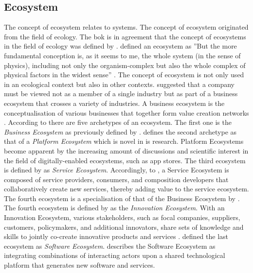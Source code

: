 \subsection{Ecosystem}
\label{sub:tbecosystem}
The concept of ecosystem relates to systems. The concept of ecosystem originated from the field of ecology. The \acrfull{bok} is in agreement that the concept of ecosystems in the field of ecology was defined by \textcite{Tansley1935}. \textcite[p.~299]{Tansley1935} defined an ecosystem as ''But the more fundamental conception is, as it seems to me, the whole system (in the sense of physics), including not only the organism-complex but also the whole complex of physical factors in the widest sense'' \parencites[p.~3]{Guggenberger2020}[p.~20]{Nurmi2021}. The concept of ecosystem is not only used in an ecological context but also in other contexts. \textcite[p.~76]{Moore1999} suggested that a company must be viewed not as a member of a single industry but as part of a business ecosystem that crosses a variety of industries. A business ecosystem is the conceptualisation of various businesses that together form value creation networks \parencite[p.~3]{Guggenberger2020}. According to \textcite[]{Guggenberger2020} there are five archetypes of an ecosystem. The first one is the \textit{Business Ecosystem} as previously defined by \textcite[p.~76]{Moore1999}. \textcite[p.~5]{Guggenberger2020} defines the second archetype as that of a \textit{Platform Ecosystem} which is novel in \acrfull{is} research. Platform Ecosystems become apparent by the increasing amount of discussions and scientific interest in the field of digitally-enabled ecosystems, such as app stores. The third ecosystem is defined by \textcite[p.~5]{Guggenberger2020} as \textit{Service Ecosystem}. Accordingly, to \textcites{Barros2006}{Papazoglou2006}{Huang2014}, a Service Ecosystem is composed of service providers, consumers, and composition developers that collaboratively create new services, thereby adding value to the service ecosystem. The fourth ecosystem is a specialisation of that of the Business Ecosystem by \textcite{Moore1999}. The fourth ecosystem is defined by \textcite[p.~5]{Guggenberger2020} as the \textit{Innovation Ecosystem}. With an Innovation Ecosystem, various stakeholders, such as focal companies, suppliers, customers, policymakers, and additional innovators, share sets of knowledge and skills to jointly co-create innovative products and services \parencites{Iansiti2004}{Gomes2018}{Carayannis2009}. \textcite[p.~5]{Guggenberger2020} defined the last ecosystem as \textit{Software Ecosystem}. \textcite{Manikas2013} describes the Software Ecosystem as integrating combinations of interacting actors upon a shared technological platform that generates new software and services.

